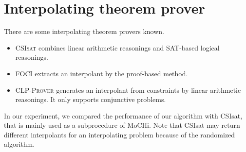 \section{Interpolating theorem prover}

There are some interpolating theorem provers known.
\begin{itemize}
\item \textsc{CSIsat} \cite{conf/cav/BeyerZM08} combines linear
  arithmetic reasonings and SAT-based logical reasonings.
\item \textsc{FOCI} \cite{website/foci} extracts an interpolant by the
  proof-based method.
\item \textsc{CLP-Prover} \cite{website/clp} generates an interpolant
 from constraints by linear arithmetic reasonings. It only supports
 conjunctive problems.
\end{itemize}

In our experiment, we compared the performance of our algorithm with
CSIsat, that is mainly used as a subprocedure of MoCHi.  Note that
CSIsat may return different interpolants for an interpolating problem
because of the randomized algorithm.
